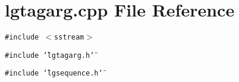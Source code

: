 \section{lgtagarg.cpp File Reference}
\label{lgtagarg_8cpp}
{\tt \#include $<$sstream$>$}\par
{\tt \#include \char`\"{}lgtagarg.h\char`\"{}}\par
{\tt \#include \char`\"{}lgsequence.h\char`\"{}}\par
